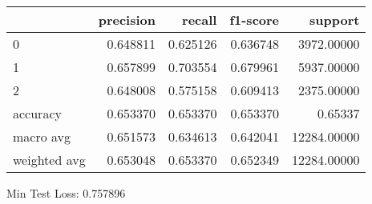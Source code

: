\begin{tabular}{lrrrr}
\toprule
{} &  precision &    recall &  f1-score &      support \\
\midrule
0            &   0.648811 &  0.625126 &  0.636748 &   3972.00000 \\
1            &   0.657899 &  0.703554 &  0.679961 &   5937.00000 \\
2            &   0.648008 &  0.575158 &  0.609413 &   2375.00000 \\
accuracy     &   0.653370 &  0.653370 &  0.653370 &      0.65337 \\
macro avg    &   0.651573 &  0.634613 &  0.642041 &  12284.00000 \\
weighted avg &   0.653048 &  0.653370 &  0.652349 &  12284.00000 \\
\bottomrule
\end{tabular}

Min Test Loss: 0.757896